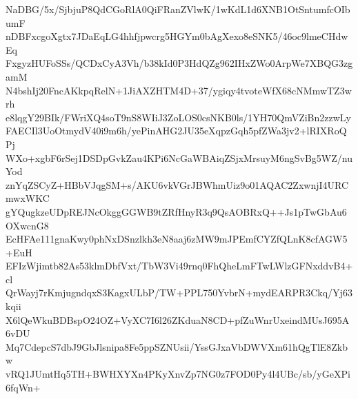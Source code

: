 NaDBG/5x/SjbjuP8QdCGoRlA0QiFRanZVlwK/1wKdL1d6XNB1OtSntumfcOIbumF
nDBFxcgoXgtx7JDaEqLG4hhfjpwcrg5HGYm0bAgXexo8eSNK5/46oc9lmeCHdwEq
FxgyzHUFoSSs/QCDxCyA3Vh/b38kId0P3HdQZg962IHxZWo0ArpWe7XBQG3zgamM
N4bshIj20FncAKkpqRelN+1JiAXZHTM4D+37/ygiqy4tvoteWfX68cNMmwTZ3wrh
e8lqgY29BIk/FWriXQ4soT9nS8WIiJ3ZoLOS0csNKB0ls/1YH70QmVZiBn2zzwLy
FAECIl3UoOtmydV40i9m6h/yePinAHG2JU35eXqpzGqh5pfZWa3jv2+lRIXRoQPj
WXo+xgbF6rSej1DSDpGvkZau4KPi6NcGaWBAiqZSjxMrsuyM6ngSvBg5WZ/nuYod
znYqZSCyZ+HBbVJqgSM+s/AKU6vkVGrJBWhmUiz9o01AQAC2ZxwnjI4URCmwxWKC
gYQugkzeUDpREJNcOkggGGWB9tZRfHnyR3q9QsAOBRxQ++Js1pTwGbAu6OXwcnG8
EcHFAe111gnaKwy0phNxDSnzlkh3eN8aaj6zMW9mJPEmfCYZfQLnK8cfAGW5+EuH
EFIzWjimtb82As53klmDbfVxt/TbW3Vi49rnq0FhQheLmFTwLWlzGFNxddvB4+cl
QrWayj7rKmjugndqxS3KagxULbP/TW+PPL750YvbrN+mydEARPR3Ckq/Yj63kqii
X6lQeWkuBDBspO24OZ+VyXC7I6l26ZKduaN8CD+pfZuWnrUxeindMUsJ695A6vDU
Mq7CdepcS7dbJ9GbJlsnipa8Fe5ppSZNUsii/YssGJxaVbDWVXm61hQgTlE8Zkbw
vRQ1JUmtHq5TH+BWHXYXn4PKyXnvZp7NG0z7FOD0Py4l4UBc/sb/yGeXPi6fqWn+
